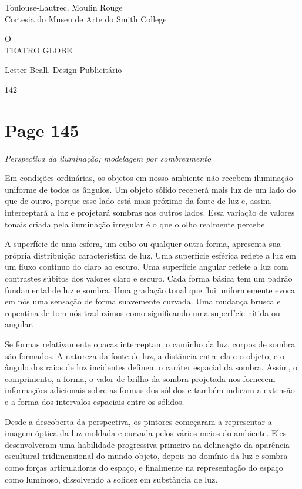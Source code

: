 \documentclass[a4paper]{article}
\begin{document}
Toulouse-Lautrec. Moulin Rouge \\
Cortesia do Museu de Arte do Smith College

O \\
TEATRO GLOBE

Lester Beall. Design Publicitário

142

\newpage
\section*{Page 145}

\textit{Perspectiva da iluminação; modelagem por sombreamento}

Em condições ordinárias, os objetos em nosso ambiente não recebem iluminação uniforme de todos os ângulos. Um objeto sólido receberá mais luz de um lado do que de outro, porque esse lado está mais próximo da fonte de luz e, assim, interceptará a luz e projetará sombras nos outros lados. Essa variação de valores tonais criada pela iluminação irregular é o que o olho realmente percebe.

A superfície de uma esfera, um cubo ou qualquer outra forma, apresenta sua própria distribuição característica de luz. Uma superfície esférica reflete a luz em um fluxo contínuo do claro ao escuro. Uma superfície angular reflete a luz com contrastes súbitos dos valores claro e escuro. Cada forma básica tem um padrão fundamental de luz e sombra. Uma gradação tonal que flui uniformemente evoca em nós uma sensação de forma suavemente curvada. Uma mudança brusca e repentina de tom nós traduzimos como significando uma superfície nítida ou angular.

Se formas relativamente opacas interceptam o caminho da luz, corpos de sombra são formados. A natureza da fonte de luz, a distância entre ela e o objeto, e o ângulo dos raios de luz incidentes definem o caráter espacial da sombra. Assim, o comprimento, a forma, o valor de brilho da sombra projetada nos fornecem informações adicionais sobre as formas dos sólidos e também indicam a extensão e a forma dos intervalos espaciais entre os sólidos.

Desde a descoberta da perspectiva, os pintores começaram a representar a imagem óptica da luz moldada e curvada pelos vários meios do ambiente. Eles desenvolveram uma habilidade progressiva primeiro na delineação da aparência escultural tridimensional do mundo-objeto, depois no domínio da luz e sombra como forças articuladoras do espaço, e finalmente na representação do espaço como luminoso, dissolvendo a solidez em substância de luz.
\end{document}
